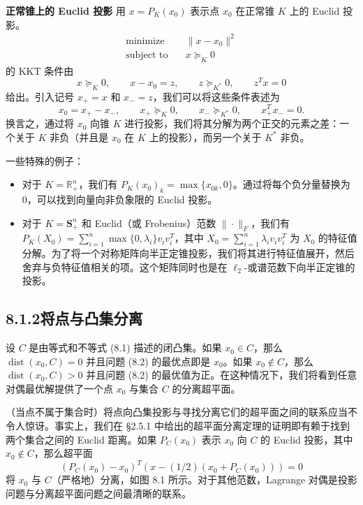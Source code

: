 \documentclass[UTF8, 12pt, fontset=fandol, oneside]{ctexart}
\begin{document}
\noindent\textbf{正常锥上的 Euclid 投影}\quad
用 $x=P_K(x_0)$ 表示点 $x_0$ 在正常锥 $K$ 上的 Euclid 投影。
\[
\begin{aligned}
\text{minimize}\quad & \|x-x_0\|^2\\
\text{subject to}\quad & x\succeq_K 0
\end{aligned}
\]
的 KKT 条件由
\[
x\succeq_K 0,\qquad x-x_0=z,\qquad z\succeq_{K^\ast}0,\qquad z^Tx=0
\]
给出。引入记号 $x_+=x$ 和 $x_-=z$，我们可以将这些条件表述为
\[
x_0=x_+-x_-,\qquad x_+\succeq_K0,\qquad x_-\succeq_{K^\ast}0,\qquad x_+^Tx_-=0.
\]
换言之，通过将 $x_0$ 向锥 $K$ 进行投影，我们将其分解为两个正交的元素之差：一个关于 $K$ 非负（并且是 $x_0$ 在 $K$ 上的投影），而另一个关于 $K^\ast$ 非负。

一些特殊的例子：

\begin{itemize}
\item 对于 $K=\mathbb{R}_+^n$，我们有 $P_K(x_0)_k=\max\{x_{0k},0\}$。通过将每个负分量替换为 $0$，可以找到向量向非负象限的 Euclid 投影。

\item 对于 $K=\mathbf{S}_+^n$ 和 Euclid（或 Frobenius）范数 $\|\cdot\|_F$，我们有 $P_K(X_0)=\sum_{i=1}^n \max\{0,\lambda_i\}v_iv_i^T$，其中 $X_0=\sum_{i=1}^n \lambda_i v_iv_i^T$ 为 $X_0$ 的特征值分解。为了将一个对称矩阵向半正定锥投影，我们将其进行特征值展开，然后舍弃与负特征值相关的项。这个矩阵同时也是在 $\ell_2$-或谱范数下向半正定锥的投影。
\end{itemize}

\subsection*{8.1.2\quad 将点与凸集分离}

设 $C$ 是由等式和不等式 (8.1) 描述的闭凸集。如果 $x_0\in C$，那么 $\operatorname{dist}(x_0,C)=0$ 并且问题 (8.2) 的最优点即是 $x_0$。如果 $x_0\notin C$，那么 $\operatorname{dist}(x_0,C)>0$ 并且问题 (8.2) 的最优值为正。在这种情况下，我们将看到任意对偶最优解提供了一个点 $x_0$ 与集合 $C$ 的分离超平面。

（当点不属于集合时）将点向凸集投影与寻找分离它们的超平面之间的联系应当不令人惊讶。事实上，我们在 \S 2.5.1 中给出的超平面分离定理的证明即有赖于找到两个集合之间的 Euclid 距离。如果 $P_C(x_0)$ 表示 $x_0$ 向 $C$ 的 Euclid 投影，其中 $x_0\notin C$，那么超平面
\[
(P_C(x_0)-x_0)^T\left(x-(1/2)(x_0+P_C(x_0))\right)=0
\]
将 $x_0$ 与 $C$（严格地）分离，如图 8.1 所示。对于其他范数，Lagrange 对偶是投影问题与分离超平面问题之间最清晰的联系。
\end{document}
